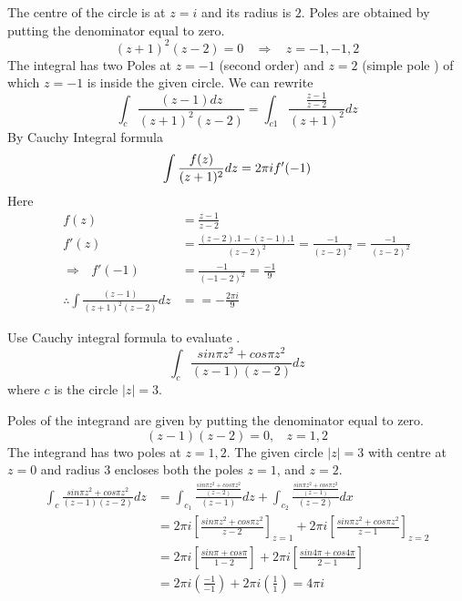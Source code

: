 \begin{solution}
The centre of the circle is at $z = i$ and its radius is $2$. Poles are obtained by putting the denominator equal to zero.
\[(z+1)^{2}(z-2)=0~~~~\Rightarrow ~~~~z=-1,-1,2\]
The integral has two Poles at $z = -1$ (second order) and $z = 2$ (simple pole ) of which $z = -1$ is inside the given circle.
We can rewrite
\[\int_{c}\frac{(z-1)dz}{(z+1)^{2}(z-2)}=\int_{c1}\frac{\frac{z-1}{z-2}}{(z+1)^{2}}dz\]
By Cauchy Integral formula 
\[\displaystyle \int\frac{f(z)}{(z+1)^{2}}dz=2\pi i f'(-1)\]
Here
\begin{align*}
f(z)&=\frac{z-1}{z-2} \\
f'(z)&=\frac{(z-2).1-(z-1).1}{(z-2)^{2}}=\frac{-1}{(z-2)^{2}}=\frac{-1}{(z-2)^{2}}\\
\Rightarrow ~~~f'(-1)&=\frac{-1}{(-1-2)^{2}}=\frac{-1}{9} \\
\therefore \int \frac{(z-1)}{(z+1)^{2}(z-2)}dz &= =-\frac{2\pi i}{9}
\end{align*}
\end{solution} 
\begin{example}
Use Cauchy integral formula to evaluate .
\[\int_{c}\frac{sin\pi z^{2}+cos\pi z^{2}}{(z-1)(z-2)}dz\]
where $c$ is the circle $|z| = 3$.
\end{example} 
\begin{solution}
Poles of the integrand are given by putting the denominator equal
to zero.
\[(z-1)(z-2)=0, ~~~~z=1,2\]
The integrand has two poles at $z = 1,2$. The given circle $|z| = 3$ with centre at $z = 0$ and radius 3 encloses both the poles $z = 1$, and $z = 2$.
\begin{align*}
	\int_{c}\frac{sin\pi z^{2}+cos\pi z^{2}}{(z-1)(z-2)}dz &=\int_{c_1}{\frac{\frac{sin\pi z^{2}+cos\pi z^{2}}{(z-2)}}{(z-1)}dz}+\int_{c_2}{\frac{\frac{sin\pi z^{2}+cos\pi z^{2}}{(z-1)}}{(z-2)}dx} \\
	&=2\pi i \left[\frac{sin\pi z^{2}+cos\pi z^{2}}{z-2}\right]_{z=1}+2\pi i\left[\frac{sin\pi z^{2}+cos\pi z^{2}}{z-1}\right]_{z=2} \\
	&=2\pi i \left[\frac{sin\pi+cos\pi}{1-2}\right]+2\pi i\left[\frac{sin4\pi+cos4\pi}{2-1}\right] \\
	&=2\pi i\left(\frac{-1}{-1}\right)+2\pi i\left(\frac{1}{1}\right)=4\pi i 
\end{align*}
\end{solution}
